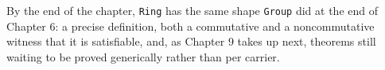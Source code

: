By the end of the chapter, \texttt{Ring} has the same shape \texttt{Group} did at the end of Chapter 6: a precise definition, both a commutative and a noncommutative witness that it is satisfiable, and, as Chapter 9 takes up next, theorems still waiting to be proved generically rather than per carrier.










